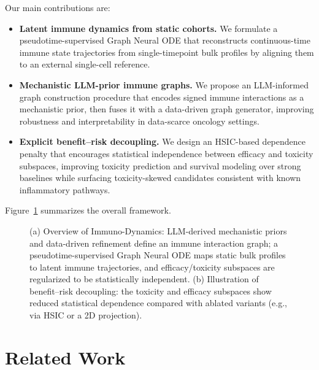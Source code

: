 \documentclass{article}
\begin{document}
Our main contributions are:
\begin{itemize}
    \item \textbf{Latent immune dynamics from static cohorts.} We formulate a pseudotime-supervised Graph Neural ODE that reconstructs continuous-time immune state trajectories from single-timepoint bulk profiles by aligning them to an external single-cell reference.
    \item \textbf{Mechanistic LLM-prior immune graphs.} We propose an LLM-informed graph construction procedure that encodes signed immune interactions as a mechanistic prior, then fuses it with a data-driven graph generator, improving robustness and interpretability in data-scarce oncology settings.
    \item \textbf{Explicit benefit--risk decoupling.} We design an HSIC-based dependence penalty that encourages statistical independence between efficacy and toxicity subspaces, improving toxicity prediction and survival modeling over strong baselines while surfacing toxicity-skewed candidates consistent with known inflammatory pathways.
\end{itemize}

Figure~\ref{fig:concept} summarizes the overall framework.

\begin{figure}[t]
  \centering
  \fbox{\rule{0pt}{2.1in}\rule{0.44\linewidth}{0pt}}
  \hfill
  \fbox{\rule{0pt}{2.1in}\rule{0.44\linewidth}{0pt}}
  \caption{(a) Overview of Immuno-Dynamics: LLM-derived mechanistic priors and data-driven refinement define an immune interaction graph; a pseudotime-supervised Graph Neural ODE maps static bulk profiles to latent immune trajectories, and efficacy/toxicity subspaces are regularized to be statistically independent. (b) Illustration of benefit--risk decoupling: the toxicity and efficacy subspaces show reduced statistical dependence compared with ablated variants (e.g., via HSIC or a 2D projection).}
  \label{fig:concept}
\end{figure}


\section{Related Work}
\end{document}
